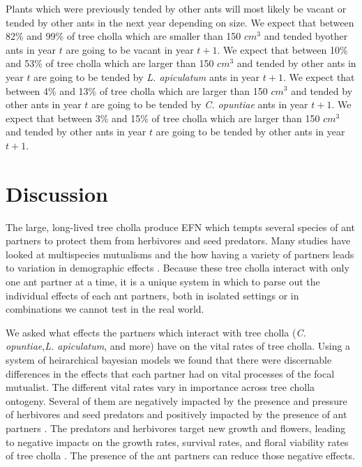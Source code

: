 \documentclass[11pt]{article}
\begin{document}
Plants which were previously tended by other ants will most likely be vacant or tended by other ants in the next year depending on size. 
We expect that between 82\% and 99\% of tree cholla which are smaller than 150 $cm^3$ and tended byother ants in year $t$ are going to be vacant in year $t+1$.
We expect that between 10\% and 53\% of tree cholla which are larger than 150 $cm^3$ and tended by other ants in year $t$ are going to be tended by \textit{L. apiculatum} ants in year $t+1$.
We expect that between 4\% and 13\% of tree cholla which are larger than 150 $cm^3$ and tended by other ants in year $t$ are going to be tended by \textit{C. opuntiae} ants in year $t+1$.
We expect that between 3\% and 15\% of tree cholla which are larger than 150 $cm^3$ and tended by other ants in year $t$ are going to be tended by other ants in year $t+1$.


\section*{Discussion}
The large, long-lived tree cholla produce EFN which tempts several species of ant partners to protect them from herbivores and seed predators. 
Many studies have looked at multispecies mutualisms and the how having a variety of partners leads to variation in demographic effects \cite{Palmer2010, Bascompte2019, Stachowicz2005, Ford2015, Baez2016}. 
Because these tree cholla interact with only one ant partner at a time, it is a unique system in which to parse out the individual effects of each ant partners, both in isolated settings or in combinations we cannot test in the real world.


We asked what effects the partners which interact with tree cholla (\textit{C. opuntiae},\textit{L. apiculatum}, and more) have on the vital rates of tree cholla. 
Using a system of heirarchical bayesian models we found that there were discernable differences in the effects that each partner had on vital processes of the focal mutualist. 
The different vital rates vary in importance across tree cholla ontogeny.
Several of them are negatively impacted by the presence and pressure of herbivores and seed predators \cite{Miller2009, Miller2006} and positively impacted by the presence of ant partners \cite{Miller2007}.
The predators and herbivores target new growth and flowers, leading to negative impacts on the growth rates, survival rates, and floral viability rates of tree cholla \cite{Louda1995, Agrawal2004}.
The presence of the ant partners can reduce those negative effects.
\end{document}

